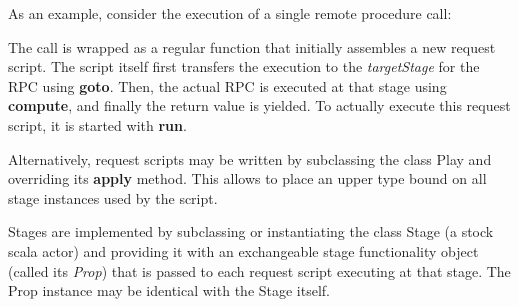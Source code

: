 \documentclass[preprint]{sigplanconf}
\begin{document}
As an example, consider the execution of a single remote procedure call: 

 \medskip

The call is wrapped as a regular function that initially assembles a new request script. The script
itself first transfers the execution to the \emph{targetStage} for the RPC using \textbf{goto}.
Then, the actual RPC is executed at that stage using \textbf{compute}, and finally the return value
is yielded. To actually execute this request script, it is started with \textbf{run}.

Alternatively, request scripts may be written by subclassing the class Play and overriding its
\textbf{apply} method. This allows to place an upper type bound on all stage instances used by the
script.

Stages are implemented by subclassing or instantiating the class Stage (a stock scala actor) and
providing it with an exchangeable stage functionality object (called its \emph{Prop}) that is passed
to each request script executing at that stage. The Prop instance may be identical with the Stage
itself.
\end{document}

